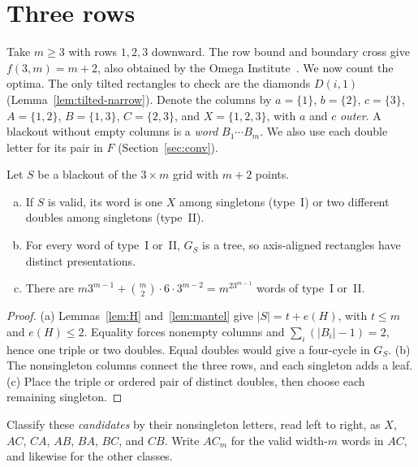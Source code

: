 \section{Three rows}\label{sec:three}

Take $m\ge3$ with rows $1,2,3$ downward. The row bound and boundary cross
give $f(3,m)=m+2$, also obtained by the Omega Institute~\cite{trureturing2026}.
We now count the optima. The only tilted rectangles to check are the diamonds
$D(i,1)$ (Lemma~\ref{lem:tilted-narrow}). Denote the columns by $a=\{1\}$, $b=\{2\}$, $c=\{3\}$,
$A=\{1,2\}$, $B=\{1,3\}$, $C=\{2,3\}$, and $X=\{1,2,3\}$, with $a$ and $c$ \emph{outer}. A
blackout without empty columns is a \emph{word} $B_1\cdots B_m$. We also use each
double letter for its pair in $F$ (Section~\ref{sec:conv}).

\begin{proposition}\label{prop:threeclass}
Let $S$ be a blackout of the $3\times m$ grid with $m+2$ points.
\begin{enumerate}[(a)]
\item If $S$ is valid, its word is one $X$ among singletons (type~I) or two different doubles
among singletons (type~II).
\item For every word of type~I or~II, $G_S$ is a tree, so axis-aligned rectangles have
distinct presentations.
\item There are $m3^{m-1}+\binom m2\cdot6\cdot3^{m-2}=m^23^{m-1}$ words of type~I or~II.
\end{enumerate}
\end{proposition}

\begin{proof}
(a) Lemmas~\ref{lem:H} and~\ref{lem:mantel} give $|S|=t+e(H)$,
with $t\le m$ and $e(H)\le2$. Equality forces nonempty columns and
$\sum_i(|B_i|-1)=2$, hence one triple or two doubles.
Equal doubles would give a four-cycle in $G_S$.
(b) The nonsingleton columns connect the three rows, and each
singleton adds a leaf. (c) Place the triple or ordered pair of distinct
doubles, then choose each remaining singleton.
\end{proof}

Classify these \emph{candidates} by their nonsingleton letters, read left
to right, as $X$, $AC$, $CA$, $AB$, $BA$, $BC$, and $CB$.
Write $AC_m$ for the valid width-$m$ words in $AC$, and likewise for the other classes.


